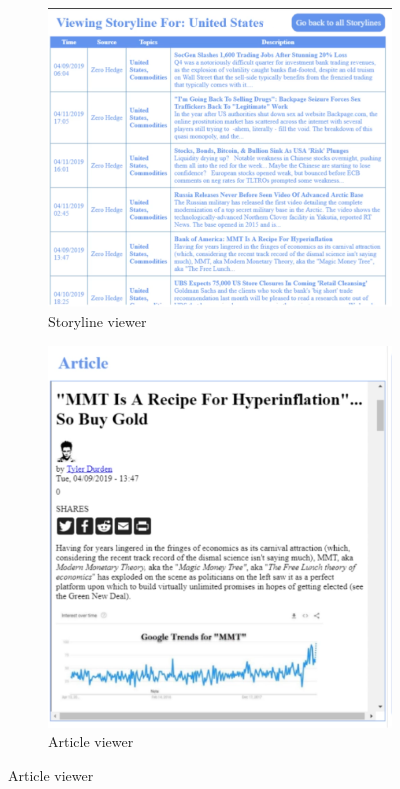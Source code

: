 \begin{figure}[bt]
\centering
\begin{subfigure}[b]{.40\linewidth}
\includegraphics[width=\linewidth]{chapters/04_muifold/figures/storyline_viewer.png}
\caption{Storyline viewer}
\end{subfigure}
\begin{subfigure}[b]{.30\linewidth}
\includegraphics[width=\linewidth]{chapters/04_muifold/figures/article_viewer.png}
\caption{Article viewer}
\end{subfigure}


\end{figure}
